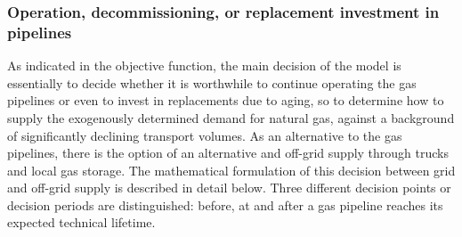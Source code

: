 \subsubsection{Operation, decommissioning, or replacement investment in pipelines}
As indicated in the objective function, the main decision of the model is essentially to decide whether it is worthwhile to continue operating the gas pipelines or even to invest in replacements due to aging, so to determine how to supply the exogenously determined demand for natural gas, against a background of significantly declining transport volumes. As an alternative to the gas pipelines, there is the option of an alternative and off-grid supply through trucks and local gas storage. The mathematical formulation of this decision between grid and off-grid supply is described in detail below. Three different decision points or decision periods are distinguished: before, at and after a gas pipeline reaches its expected technical lifetime.\vspace{0.3cm}

